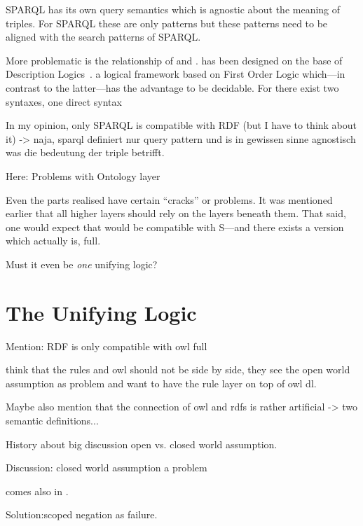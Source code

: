 SPARQL has its own query semantics which is agnostic about the meaning of \rdf triples. For SPARQL these are only patterns but these patterns need to be aligned 
with the search patterns of SPARQL.

More problematic is the relationship of \owl and \rdf. \owl  has been designed on the base of Description Logics~\cite{dl}. a logical framework based on First Order Logic 
which---in contrast to the latter---has the advantage to be decidable. For \owl there exist two syntaxes, one direct syntax 



In my opinion, only SPARQL is compatible with RDF (but I have to think about it) -> naja, sparql definiert nur query pattern und is in gewissen sinne agnostisch was die bedeutung der triple betrifft.

Here: Problems with Ontology layer

Even the parts realised have certain ``cracks'' or problems. It was mentioned earlier that all higher layers should rely
on the layers beneath them. That said, one would expect that \owl would be compatible with \rdf{}S---and there exists a version which actually is, \owl full. 

Must it even be \emph{one} unifying logic?

\section{The Unifying Logic}



Mention: RDF is only compatible with owl full

\cite{twotowers} think that the rules and owl should not be side by side, they see the open world assumption as problem and want to have the rule layer on top of owl dl.

Maybe also mention that the connection of owl and rdfs is rather artificial -> two semantic definitions...


History about big discussion open vs. closed world assumption.

Discussion: closed world assumption a problem

comes also in \cite{rearch}.

Solution:scoped negation as failure.

